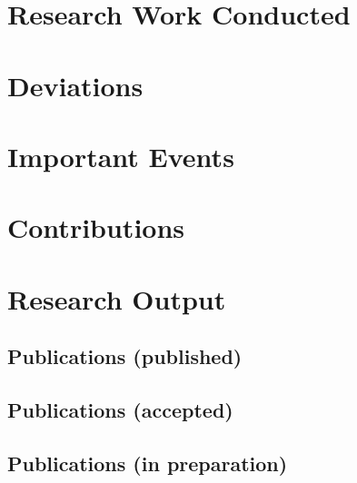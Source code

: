 \documentclass[manuscript,\review anonymous]{acmart}
\begin{document}
\section{Research Work Conducted}

\section{Deviations}

\section{Important Events}

\section{Contributions}

\section{Research Output}

\subsection{Publications (published)}
\subsection{Publications (accepted)}
\subsection{Publications (in preparation)}



\end{document}

